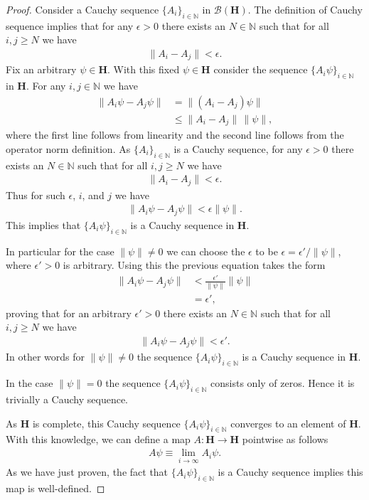 \begin{proof}
Consider a Cauchy sequence $\{A_i\}_{i \in \mathbb{N}}$ in $\mathcal{B}(\mathbf{H})$. The definition of Cauchy sequence implies that for any $\epsilon > 0$ there exists an $N \in \mathbb{N}$ such that for all $i,j \ge N$ we have
\begin{align}
    \|A_i - A_j\| < \epsilon.
\end{align}
Fix an arbitrary $\psi \in \mathbf{H}$. With this fixed $\psi \in \mathbf{H}$ consider the sequence $\{A_i\psi\}_{i \in \mathbb{N}}$ in $\mathbf{H}$. For any $i,j \in \mathbb{N}$ we have
\begin{align}
    \|A_i\psi - A_j\psi\| &= \|(A_i - A_j)\psi\| \\
                          &\le \|A_i - A_j\| \, \|\psi\|,
\end{align}
where the first line follows from linearity and the second line follows from the operator norm definition. As $\{A_i\}_{i \in \mathbb{N}}$ is a Cauchy sequence, for any $\epsilon > 0$ there exists an $N \in \mathbb{N}$ such that for all $i,j \ge N$ we have
\begin{align}
    \|A_i - A_j\| < \epsilon.
\end{align}
Thus for such $\epsilon$, $i$, and $j$ we have
\begin{align}
    \|A_i\psi - A_j\psi\| < \epsilon \|\psi\|.
\end{align}
This implies that $\{A_i\psi\}_{i \in \mathbb{N}}$ is a Cauchy sequence in $\mathbf{H}$.

In particular for the case $\|\psi\| \neq 0$ we can choose the $\epsilon$ to be $\epsilon = \epsilon' / \|\psi\|$, where $\epsilon' > 0$ is arbitrary. Using this the previous equation takes the form
\begin{align}
    \|A_i\psi - A_j\psi\| &< \frac{\epsilon'}{\|\psi\|} \|\psi\| \\
                          &= \epsilon',
\end{align}
proving that for an arbitrary $\epsilon' > 0$ there exists an $N \in \mathbb{N}$ such that for all $i,j \ge N$ we have
\begin{align}
    \|A_i\psi - A_j\psi\| < \epsilon'.
\end{align}
In other words for $\|\psi\| \neq 0$ the sequence $\{A_i\psi\}_{i \in \mathbb{N}}$ is a Cauchy sequence in $\mathbf{H}$.

In the case $\|\psi\| = 0$ the sequence $\{A_i\psi\}_{i \in \mathbb{N}}$ consists only of zeros. Hence it is trivially a Cauchy sequence.

As $\mathbf{H}$ is complete, this Cauchy sequence $\{A_i\psi\}_{i \in \mathbb{N}}$ converges to an element of $\mathbf{H}$. With this knowledge, we can define a map $A : \mathbf{H} \rightarrow \mathbf{H}$ pointwise as follows
\begin{align}
    A\psi \equiv \lim\limits_{i \rightarrow \infty} A_i\psi.
\end{align}
As we have just proven, the fact that $\{A_i\psi\}_{i \in \mathbb{N}}$ is a Cauchy sequence implies this map is well-defined.


\end{proof}
